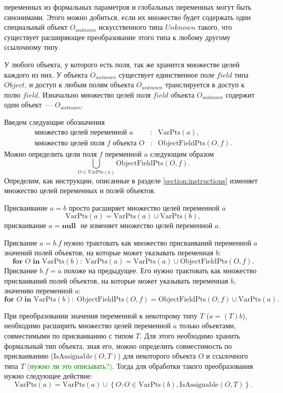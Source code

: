 \documentclass[14pt,titlepage]{extarticle}
\newcommand{\NULL}{\textbf{null }}
\newcommand{\VPts}[1]{\textrm{VarPts}(#1)}
\newcommand{\OFPts}[2]{\textrm{ObjectFieldPts}(#1, #2)}
\newcommand{\IsAssignable}[2]{\textrm{IsAssignable}(#1, #2)}
\newcommand{\remark}[1]{\textcolor{Green}{#1}}
\begin{document}
      переменных из формальных параметров и глобальных переменных могут быть
      синонимами. Этого можно добиться, если их множество будет содержать один
      специальный объект $O_{unknown}$ искусственного типа $Unknown$ такого,
      что существует расширяющее преобразование этого типа к любому другому
      ссылочному типу.

      У любого объекта, у которого есть поля, так же хранится множестве целей
      каждого из них. У объекта $O_{unknown}$ существует единственное поле
      $field$ типа $Object$, и доступ к любым полям объекта $O_{unknown}$
      транслируется в доступ к полю $field$. Изначально множество целей
      поля $field$ объекта $O_{unknown}$ содержит один объект~---
      $O_{unknown}$.

      Введем следующие обозначения
      \begin{eqnarray*}
        \textrm{множество целей переменной $a$}&:& \VPts{a}, \\
        \textrm{множество целей поля $f$ объекта $O$}&:& \OFPts{O}{f}.
      \end{eqnarray*}
      Можно определить цели поля $f$ переменной $a$ следующим образом
      \[ \bigcup\limits_{O \in \VPts{a}} \OFPts{O}{f}.\]
      Определим, как инструкции, описанные в разделе \ref{section:instructions}
      изменяет множество целей переменных и полей объектов.

      Присваивание $a = b$ просто расширяет множество целей переменной $a$
      \[\VPts{a} = \VPts{a} \cup \VPts{b},\]
      присваивание $a = \NULL$ не изменяет множество целей переменной $a$.

      Присвание $a = b.f$ нужно трактовать как множество присваиваний
      переменной $a$ значений полей объектов, на которые может указывать переменная
      $b$:
      \[
        \textbf{for } O \textbf{ in } \VPts{b} \colon
        \; \VPts{a} = \VPts{a} \cup \OFPts{O}{f}.
      \]
      Присвание $b.f = a$ похоже на предыдущее. Его нужно трактовать как
      множество присваиваний полей объектов, на которые может указывать
      переменная $b$, значению переменной $a$:
      \[
        \textbf{for } O \textbf{ in } \VPts{b} \colon
        \; \OFPts{O}{f} = \OFPts{O}{f} \cup \VPts{a}.
      \]

      При преобразовании значения переменной к некоторому типу $T$
      ($a = (T)b$), необходимо расширить множество целей переменной $a$ только
      объектами, совместимыми по присваиванию с типом $T$. Для этого необходимо
      хранить формальный тип объекта, зная его, можно определить совместимость
      по присваиванию ($\IsAssignable{O}{T}$) для некоторого объекта $O$ и
      ссылочного типа $T$\remark{ (нужно ли это описывать?)}.
      Тогда для обработки такого преобразования нужно следующее действие:
      \[
        \VPts{a} = \VPts{a} \cup
            \left\{ O \colon O \in \VPts{b}, \IsAssignable{O}{T} \right\}.
      \]
\end{document}
